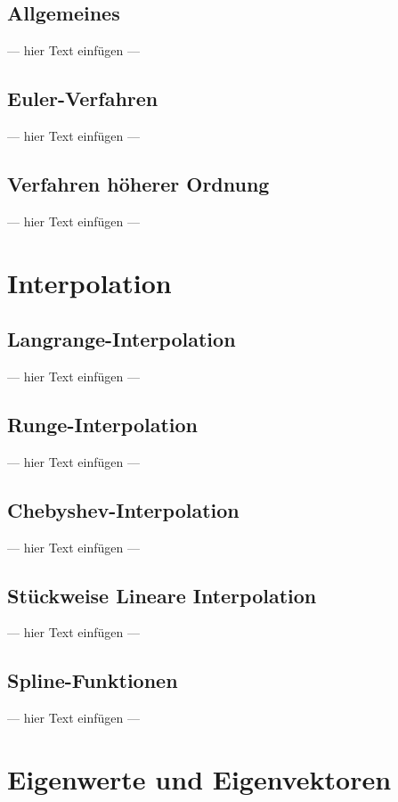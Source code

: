 \documentclass[a4paper, 12pt]{article}
\begin{document}
\subsection{Allgemeines}
--- hier Text einfügen ---


\subsection{Euler-Verfahren}
--- hier Text einfügen ---


\subsection{Verfahren höherer Ordnung}
--- hier Text einfügen ---



\section{Interpolation}


\subsection{Langrange-Interpolation}
--- hier Text einfügen ---


\subsection{Runge-Interpolation}
--- hier Text einfügen ---


\subsection{Chebyshev-Interpolation}
--- hier Text einfügen ---


\subsection{Stückweise Lineare Interpolation}
--- hier Text einfügen ---


\subsection{Spline-Funktionen}
--- hier Text einfügen ---



\section{Eigenwerte und Eigenvektoren}
\end{document}
